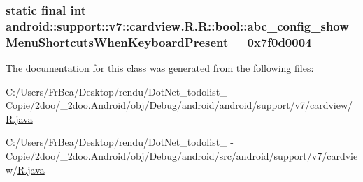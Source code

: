 \hypertarget{classandroid_1_1support_1_1v7_1_1cardview_1_1_r_1_1bool_e92ccf38955ece79dc5ef13cea1584d2}{
\subsubsection[{abc\_\-config\_\-showMenuShortcutsWhenKeyboardPresent}]{\setlength{\rightskip}{0pt plus 5cm}static final int android::support::v7::cardview.R.R::bool::abc\_\-config\_\-showMenuShortcutsWhenKeyboardPresent = 0x7f0d0004}}
\label{classandroid_1_1support_1_1v7_1_1cardview_1_1_r_1_1bool_e92ccf38955ece79dc5ef13cea1584d2}




The documentation for this class was generated from the following files:\begin{CompactItemize}
\item 
C:/Users/FrBea/Desktop/rendu/DotNet\_\-todolist\_ - Copie/2doo/\_\-2doo.Android/obj/Debug/android/android/support/v7/cardview/\hyperlink{android_2support_2v7_2cardview_2_r_8java}{R.java}\item 
C:/Users/FrBea/Desktop/rendu/DotNet\_\-todolist\_ - Copie/2doo/\_\-2doo.Android/obj/Debug/android/src/android/support/v7/cardview/\hyperlink{src_2android_2support_2v7_2cardview_2_r_8java}{R.java}\end{CompactItemize}
